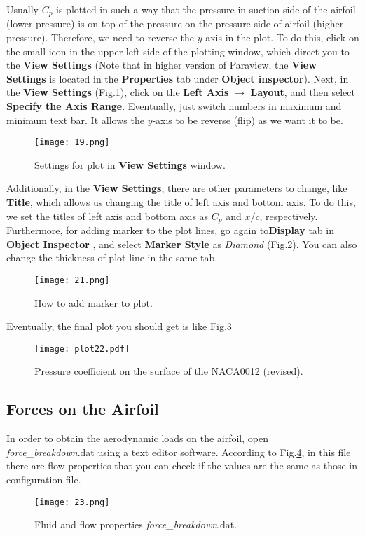 Usually $C_p$ is plotted in such a way that the pressure in suction side of the airfoil (lower pressure) is on top of the pressure on the pressure side of airfoil (higher pressure). Therefore, we need to reverse the $y$-axis in the plot. To do this, click on the small icon in the upper left side of the plotting window, which direct you to the \textbf{View Settings} (Note that in higher version of Paraview, the \textbf{View Settings} is located in the \textbf{Properties} tab under \textbf{Object inspector}). Next, in the \textbf{View Settings} (Fig.\ref{fig:viewsetting}), click on the \textbf{Left Axis} $\rightarrow$ \textbf{Layout}, and then select \textbf{Specify the Axis Range}. Eventually, just switch numbers in maximum and minimum text bar. It allows the $y$-axis to be reverse (flip) as we want it to be.
\begin{figure}[htbp]
    \centering
    \texttt{[image: 19.png]}
    \caption{Settings for plot in \textbf{View Settings} window.}
    \label{fig:viewsetting}
\end{figure}
Additionally, in the \textbf{View Settings}, there are other parameters to change, like \textbf{Title}, which allows us changing the title of left axis and bottom axis. To do this, we set the titles of left axis and bottom axis as $C_p$ and $x/c$, respectively. Furthermore, for adding marker to the plot lines, go again to\textbf{Display} tab in \textbf{Object Inspector} , and select \textbf{Marker Style} as \textit{Diamond} (Fig.\ref{fig:marker}). You can also change the thickness of plot line in the same tab.
\begin{figure}[htbp]
    \centering
    \texttt{[image: 21.png]}
    \caption{How to add marker to plot.}
    \label{fig:marker}
\end{figure}
Eventually, the final plot you should get is like Fig.\ref{fig:surface_pressure2}
\begin{figure}[htbp]
    \centering
    \texttt{[image: plot22.pdf]}
    \caption{Pressure coefficient on the surface of the NACA0012 (revised).}
    \label{fig:surface_pressure2}
\end{figure}

\subsection{Forces on the Airfoil}
In order to obtain the aerodynamic loads on the airfoil, open \textit{force\_breakdown}.dat using a text editor software. According to Fig.\ref{fig:forcefile1}, in this file there are flow properties that you can check if the values are the same as those in configuration file. 
\begin{figure}[htbp]
    \centering
    \texttt{[image: 23.png]}
    \caption{Fluid and flow properties \textit{force\_breakdown}.dat.}
    \label{fig:forcefile1}
\end{figure}

